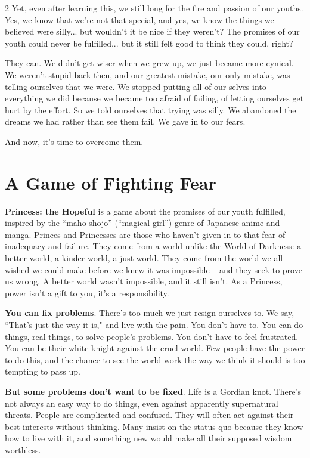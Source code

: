 \begin{multicols}{2}
Yet, even after learning this, we still long for the fire and passion of our youths. Yes, we know that we're not that special, and yes, we know the things we believed were silly... but wouldn't it be nice if they weren't? The promises of our youth could never be fulfilled... but it still felt good to think they could, right?

They can. We didn't get wiser when we grew up, we just became more cynical. We weren't stupid back then, and our greatest mistake, our only mistake, was telling ourselves that we were. We stopped putting all of our selves into everything we did because we became too afraid of failing, of letting ourselves get hurt by the effort. So we told ourselves that trying was silly. We abandoned the dreams we had rather than see them fail. We gave in to our fears.

And now, it's time to overcome them.

\section*{A Game of Fighting Fear}

\textbf{Princess: the Hopeful} is a game about the promises of our youth fulfilled, inspired by the “maho shojo” (“magical girl”) genre of Japanese anime and manga. Princes and Princesses are those who haven't given in to that fear of inadequacy and failure. They come from a world unlike the World of Darkness: a better world, a kinder world, a just world. They come from the world we all wished we could make before we knew it was impossible – and they seek to prove us wrong. A better world wasn't impossible, and it still isn't. As a Princess, power isn't a gift to you, it's a responsibility.

\textbf{You can fix problems}. There's too much we just resign ourselves to. We say, \textquotedblleft That's just the way it is," and live with the pain. You don't have to. You can do things, real things, to solve people's problems. You don't have to feel frustrated. You can be their white knight against the cruel world. Few people have the power to do this, and the chance to see the world work the way we think it should is too tempting to pass up.

\textbf{But some problems don't want to be fixed}. Life is a Gordian knot. There's not always an easy way to do things, even against apparently supernatural threats. People are complicated and confused. They will often act against their best interests without thinking. Many insist on the status quo because they know how to live with it, and something new would make all their supposed wisdom worthless.


\end{multicols}
